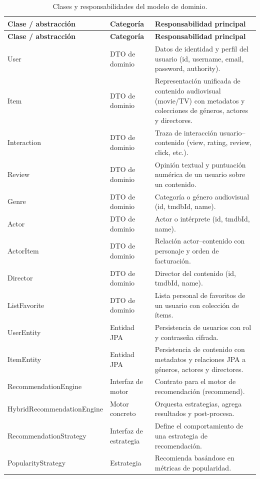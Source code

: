 \begin{longtable}{L{4.3cm} L{2.4cm} L{6.6cm}}
\caption{Clases y responsabilidades del modelo de dominio.}\label{tab:clases-candidatas}\\
\toprule
\textbf{Clase / abstracción} & \textbf{Categoría} & \textbf{Responsabilidad principal} \\
\midrule
\endfirsthead
\toprule
\textbf{Clase / abstracción} & \textbf{Categoría} & \textbf{Responsabilidad principal} \\
\midrule
\endhead

User & DTO de dominio & Datos de identidad y perfil del usuario (id, username, email, password, authority). \\
Item & DTO de dominio & Representación unificada de contenido audiovisual (movie/TV) con metadatos y colecciones de géneros, actores y directores. \\
Interaction & DTO de dominio & Traza de interacción usuario--contenido (view, rating, review, click, etc.). \\
Review & DTO de dominio & Opinión textual y puntuación numérica de un usuario sobre un contenido. \\
Genre & DTO de dominio & Categoría o género audiovisual (id, tmdbId, name). \\
Actor & DTO de dominio & Actor o intérprete (id, tmdbId, name). \\
ActorItem & DTO de dominio & Relación actor--contenido con personaje y orden de facturación. \\
Director & DTO de dominio & Director del contenido (id, tmdbId, name). \\
ListFavorite & DTO de dominio & Lista personal de favoritos de un usuario con colección de ítems. \\
UserEntity & Entidad JPA & Persistencia de usuarios con rol y contraseña cifrada. \\
ItemEntity & Entidad JPA & Persistencia de contenido con metadatos y relaciones JPA a géneros, actores y directores. \\
RecommendationEngine & Interfaz de motor & Contrato para el motor de recomendación (recommend). \\
HybridRecommendationEngine & Motor concreto & Orquesta estrategias, agrega resultados y post-procesa. \\
RecommendationStrategy & Interfaz de estrategia & Define el comportamiento de una estrategia de recomendación. \\
PopularityStrategy & Estrategia & Recomienda basándose en métricas de popularidad. \\

\end{longtable}
